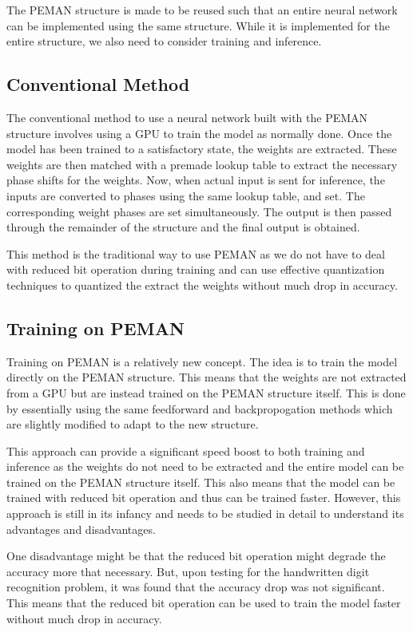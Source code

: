 The PEMAN structure is made to be reused such that an entire neural network can be implemented using the same structure. While it is implemented for the entire structure, we also need to consider training and inference.

\subsection{Conventional Method}

The conventional method to use a neural network built with the PEMAN structure involves using a GPU to train the model as normally done. Once the model has been trained to a satisfactory state, the weights are extracted. These weights are then matched with a premade lookup table to extract the necessary phase shifts for the weights. Now, when actual input is sent for inference, the inputs are converted to phases using the same lookup table, and set. The corresponding weight phases are set simultaneously. The output is then passed through the remainder of the structure and the final output is obtained.

This method is the traditional way to use PEMAN as we do not have to deal with reduced bit operation during training and can use effective quantization techniques to quantized the extract the weights without much drop in accuracy.

\subsection{Training on PEMAN}

Training on PEMAN is a relatively new concept. The idea is to train the model directly on the PEMAN structure. This means that the weights are not extracted from a GPU but are instead trained on the PEMAN structure itself. This is done by essentially using the same feedforward and backpropogation methods which are slightly modified to adapt to the new structure.

This approach can provide a significant speed boost to both training and inference as the weights do not need to be extracted and the entire model can be trained on the PEMAN structure itself. This also means that the model can be trained with reduced bit operation and thus can be trained faster. However, this approach is still in its infancy and needs to be studied in detail to understand its advantages and disadvantages.

One disadvantage might be that the reduced bit operation might degrade the accuracy more that necessary. But, upon testing for the handwritten digit recognition problem, it was found that the accuracy drop was not significant. This means that the reduced bit operation can be used to train the model faster without much drop in accuracy.

